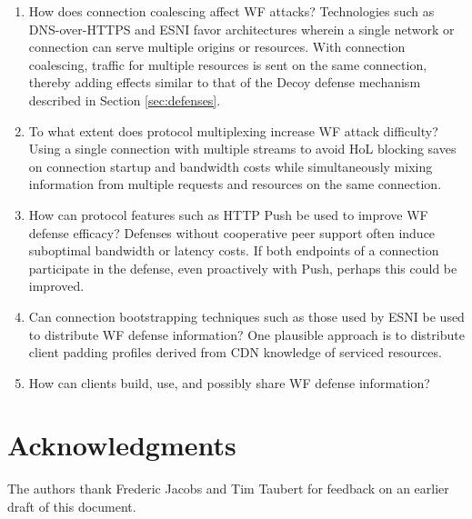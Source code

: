 \documentclass[runningheads]{llncs}
\begin{document}
\begin{enumerate}
\item How does connection coalescing affect WF attacks? Technologies such as DNS-over-HTTPS and ESNI favor
architectures wherein a single network or connection can serve multiple origins or resources. With connection
coalescing, traffic for multiple resources is sent on the same connection, thereby adding effects similar
to that of the Decoy defense mechanism described in Section \ref{sec:defenses}.
\item To what extent does protocol multiplexing increase WF attack difficulty? Using a single connection
with multiple streams to avoid HoL blocking saves on connection startup and bandwidth costs while simultaneously
mixing information from multiple requests and resources on the same connection.
\item How can protocol features such as HTTP Push be used to improve WF defense efficacy? Defenses without
cooperative peer support often induce suboptimal bandwidth or latency costs. If both endpoints of a connection
participate in the defense, even proactively with Push, perhaps this could be improved.
\item Can connection bootstrapping techniques such as those used by ESNI be used to distribute WF defense
information? One plausible approach is to distribute client padding profiles derived from CDN knowledge
of serviced resources.
\item How can clients build, use, and possibly share WF defense information?
\end{enumerate}

\section{Acknowledgments}
The authors thank Frederic Jacobs and Tim Taubert for feedback on an earlier draft of this document.



\end{document}
